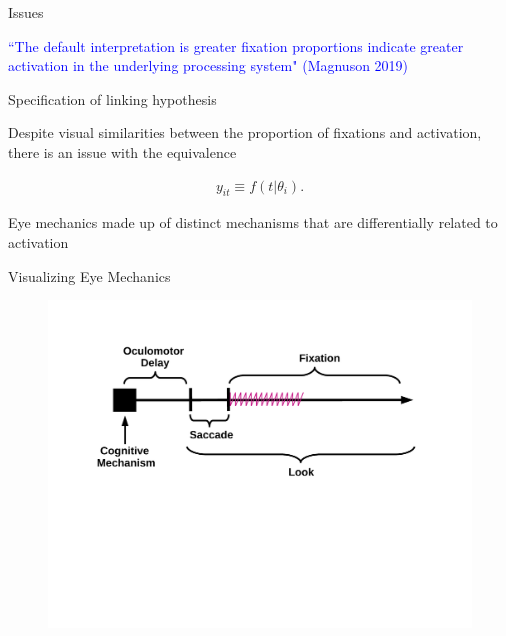 \documentclass{beamer}
\newcommand{\vp}{\vspace{2mm}}
\providecommand{\cn}[1]{\textcolor{blue}{#1}}
\begin{document}
%
%
%
%
%
%

\begin{frame}{Issues}

\cn{``The default interpretation is greater fixation proportions indicate greater activation in the underlying processing system" (Magnuson 2019)} \vp

Specification of linking hypothesis \vp

Despite visual similarities between the proportion of fixations and activation, there is an issue with the equivalence

\begin{align*}
y_{it} \equiv f(t | \theta_i).
\end{align*}

Eye mechanics made up of distinct mechanisms that are differentially related to activation 


\end{frame}

\begin{frame}{Visualizing Eye Mechanics}
\vspace{-1mm}
\begin{figure}
\centering
\includegraphics[scale=0.45]{img/what_is_a_look.pdf}
\end{figure}
\end{frame}
\end{document}
